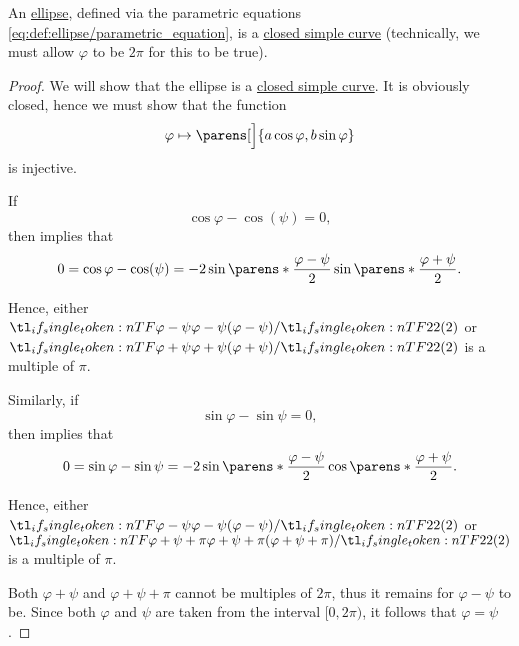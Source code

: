 \begin{proposition}\label{thm:ellipse_is_closed_simple_curve}
  An \hyperref[def:ellipse]{ellipse}, defined via the parametric equations \eqref{eq:def:ellipse/parametric_equation}, is a \hyperref[def:parametric_curve/simple]{closed simple curve} (technically, we must allow \( \varphi \) to be \( 2\pi \) for this to be true).
\end{proposition}
\begin{proof}
  We will show that the ellipse is a \hyperref[def:parametric_curve/simple]{closed simple curve}. It is obviously closed, hence we must show that the function
  \begin{equation*}
    \varphi \mapsto \parens[\Big]{ a \cos \varphi, b \sin \varphi }
  \end{equation*}
  is injective.

  If
  \begin{equation*}
    \cos \varphi - \cos(\psi) = 0,
  \end{equation*}
  then  implies that
  \begin{equation*}
    0
    =
    \cos \varphi - \cos(\psi)
    =
    -2 \sin\parens*{ \frac{\varphi - \psi} 2 } \sin\parens*{ \frac{\varphi + \psi} 2 }.
  \end{equation*}

  Hence, either \( \ifrac {\varphi - \psi} 2 \) or \( \ifrac {\varphi + \psi} 2 \) is a multiple of \( \pi \).

  Similarly, if
  \begin{equation*}
    \sin \varphi - \sin \psi = 0,
  \end{equation*}
  then  implies that
  \begin{equation*}
    0
    =
    \sin \varphi - \sin \psi
    =
    -2 \sin\parens*{ \frac{\varphi - \psi} 2 } \cos\parens*{ \frac{\varphi + \psi} 2 }.
  \end{equation*}

  Hence, either \( \ifrac {\varphi - \psi} 2 \) or \( \ifrac {\varphi + \psi + \pi} 2 \) is a multiple of \( \pi \).

  Both \( \varphi + \psi \) and \( \varphi + \psi + \pi \) cannot be multiples of \( 2\pi \),  thus it remains for \( \varphi - \psi \) to be. Since both \( \varphi \) and \( \psi \) are taken from the interval \( [0, 2\pi) \), it follows that \( \varphi = \psi \).
\end{proof}

